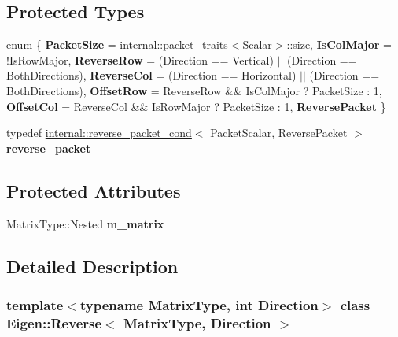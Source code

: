 \subsection*{Protected Types}
\begin{DoxyCompactItemize}
\item 
\mbox{\label{class_eigen_1_1_reverse_aeeb8bfa3b5952aeec18e13f8c6dc3fc1}} 
enum \{ \newline
{\bfseries Packet\+Size} = internal\+::packet\+\_\+traits$<$Scalar$>$\+::size, 
{\bfseries Is\+Col\+Major} = !\+Is\+Row\+Major, 
{\bfseries Reverse\+Row} = (Direction == Vertical) $\vert$$\vert$ (Direction == Both\+Directions), 
{\bfseries Reverse\+Col} = (Direction == Horizontal) $\vert$$\vert$ (Direction == Both\+Directions), 
\newline
{\bfseries Offset\+Row} = Reverse\+Row \&\& Is\+Col\+Major ? Packet\+Size \+: 1, 
{\bfseries Offset\+Col} = Reverse\+Col \&\& Is\+Row\+Major ? Packet\+Size \+: 1, 
{\bfseries Reverse\+Packet}
 \}
\item 
\mbox{\label{class_eigen_1_1_reverse_a4e8cdf354cf1da1918754405bcb60ea0}} 
typedef \mbox{\hyperlink{struct_eigen_1_1internal_1_1reverse__packet__cond}{internal\+::reverse\+\_\+packet\+\_\+cond}}$<$ Packet\+Scalar, Reverse\+Packet $>$ {\bfseries reverse\+\_\+packet}
\end{DoxyCompactItemize}
\subsection*{Protected Attributes}
\begin{DoxyCompactItemize}
\item 
\mbox{\label{class_eigen_1_1_reverse_ae722e74e5d0b115f8ccb4d65632f741b}} 
Matrix\+Type\+::\+Nested {\bfseries m\+\_\+matrix}
\end{DoxyCompactItemize}


\subsection{Detailed Description}
\subsubsection*{template$<$typename Matrix\+Type, int Direction$>$\newline
class Eigen\+::\+Reverse$<$ Matrix\+Type, Direction $>$}

